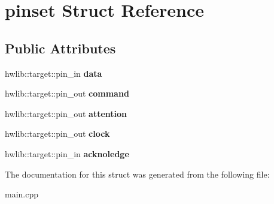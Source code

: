 \hypertarget{structpinset}{}\section{pinset Struct Reference}
\label{structpinset}
\subsection*{Public Attributes}
\begin{DoxyCompactItemize}
\item 
\mbox{\label{structpinset_a0af0bd62888f3044ff2249097c7056ed}} 
hwlib\+::target\+::pin\+\_\+in {\bfseries data}
\item 
\mbox{\label{structpinset_ad5725abb0c92d71f10d2a7957c0ed6a2}} 
hwlib\+::target\+::pin\+\_\+out {\bfseries command}
\item 
\mbox{\label{structpinset_a9ec046fb2ec45b8cef9b4273d48974a1}} 
hwlib\+::target\+::pin\+\_\+out {\bfseries attention}
\item 
\mbox{\label{structpinset_ab59387f68742b710603922670283423a}} 
hwlib\+::target\+::pin\+\_\+out {\bfseries clock}
\item 
\mbox{\label{structpinset_a674077ec47f90197225e1fa899049242}} 
hwlib\+::target\+::pin\+\_\+in {\bfseries acknoledge}
\end{DoxyCompactItemize}


The documentation for this struct was generated from the following file\+:\begin{DoxyCompactItemize}
\item 
main.\+cpp\end{DoxyCompactItemize}
